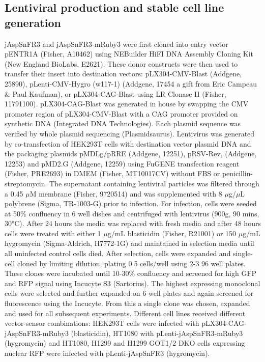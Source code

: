 \subsection{Lentiviral production and stable cell line generation}
jAspSnFR3 and jAspSnFR3-mRuby3 were first cloned into entry vector pENTR1A (Fisher, A10462) using NEBuilder HiFI DNA Assembly Cloning Kit (New England BioLabs, E2621).
These donor constructs were then used to transfer their insert into destination vectors: pLX304-CMV-Blast (Addgene, 25890), pLenti-CMV-Hygro (w117-1) (Addgene, 17454 a gift from Eric Campeau \& Paul Kaufman), or pLX304-CAG-Blast using LR Clonase II (Fisher, 11791100).
pLX304-CAG-Blast was generated in house by swapping the CMV promoter region of pLX304-CMV-Blast with a CAG promoter provided on synthetic DNA (Integrated DNA Technologies).
Each plasmid sequence was verified by whole plasmid sequencing (Plasmidsaurus).
Lentivirus was generated by co-transfection of HEK293T cells with destination vector plasmid DNA and the packaging plasmids pMDLg/pRRE (Addgene, 12251), pRSV-Rev, (Addgene, 12253) and pMD2.G (Addgene, 12259) using FuGENE transfection reagent (Fisher, PRE2693) in DMEM (Fisher, MT10017CV) without FBS or penicillin-streptomycin.
The supernatant containing lentiviral particles was filtered through a 0.45 $\mu$M membrane (Fisher, 9720514) and was supplemented with 8 $\mu$g/$\mu$L polybrene (Sigma, TR-1003-G) prior to infection.
For infection, cells were seeded at 50\% confluency in 6 well dishes and centrifuged with lentivirus (900g, 90 mins, 30°C).
After 24 hours the media was replaced with fresh media and after 48 hours cells were treated with either 1 $\mu$g/mL blasticidin (Fisher, R21001) or 150 $\mu$g/mL hygromycin (Sigma-Aldrich, H7772-1G) and maintained in selection media until all uninfected control cells died.
After selection, cells were expanded and single-cell cloned by limiting dilution, plating 0.5 cells/well using 2-3 96 well plates.
These clones were incubated until 10-30\% confluency and screened for high GFP and RFP signal using Incucyte S3 (Sartorius).
The highest expressing monoclonal cells were selected and further expanded on 6 well plates and again screened for fluorescence using the Incucyte.
From this a single clone was chosen, expanded and used for all subsequent experiments.
Different cell lines received different vector-sensor combinations: HEK293T cells were infected with pLX304-CAG-jAspSnFR3-mRuby3 (blasticidin), HT1080 with pLenti-jAspSnFR3-mRuby3 (hygromycin) and HT1080, H1299 and H1299 GOT1/2 DKO cells expressing nuclear RFP were infected with pLenti-jAspSnFR3 (hygromycin).

